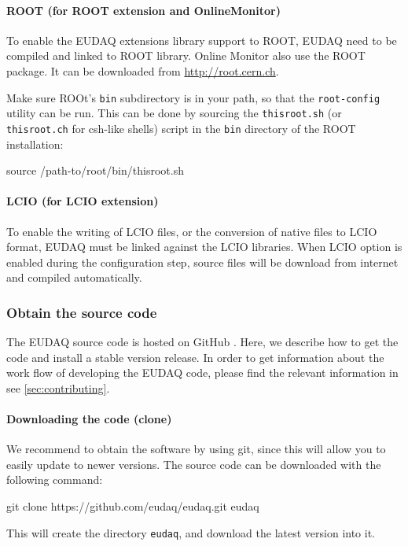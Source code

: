 \paragraph{ROOT (for ROOT extension and OnlineMonitor)}
\label{sec:Root}
To enable the EUDAQ extensions library support to ROOT, EUDAQ need to be compiled and linked to ROOT library.
Online Monitor also use the ROOT package.
It can be downloaded from \url{http://root.cern.ch}.

Make sure ROOt's \texttt{bin} subdirectory is in your path, so that the \texttt{root-config} utility can be run.
This can be done by sourcing the \texttt{thisroot.sh} (or \texttt{thisroot.ch} for csh-like shells)
script in the \texttt{bin} directory of the ROOT installation:
\begin{listing}[mybash]
source /path-to/root/bin/thisroot.sh
\end{listing}

\paragraph{LCIO (for LCIO extension)}
\label{sec:LCIO}
To enable the writing of \gls{LCIO} files, or the conversion of native files to \gls{LCIO} format,
EUDAQ must be linked against the \gls{LCIO} libraries.
When LCIO option is enabled during the configuration step, source files will be download from internet and compiled automatically.

\subsubsection{Obtain the source code}
\label{sec:downloadingEUDAQ}

The EUDAQ source code is hosted on GitHub \cite{githubEUDAQ}. 
Here, we describe how to get the code and install a stable version release. 
In order to get information about the work flow of developing the EUDAQ code, please find the relevant information in see \autoref{sec:contributing}.

\paragraph{Downloading the code (clone)}
We recommend to obtain the software by using git,
since this will allow you to easily update to newer versions.
The source code can be downloaded with the following command:
\begin{listing}[mybash]
git clone https://github.com/eudaq/eudaq.git eudaq
\end{listing}
This will create the directory \texttt{eudaq}, and download the latest
version into it. 

